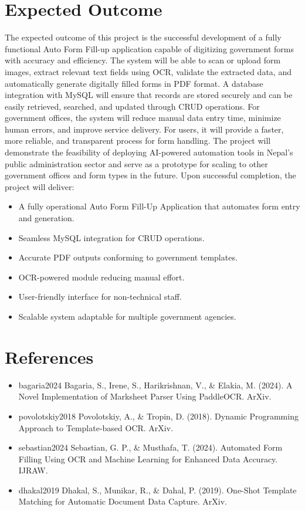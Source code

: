 \documentclass[12pt,a4paper]{report}
\begin{document}
\chapter{Expected Outcome}
The expected outcome of this project is the successful development of a fully functional Auto Form Fill-up application capable of digitizing government forms with accuracy and efficiency. The system will be able to scan or upload form images, extract relevant text fields using OCR, validate the extracted data, and automatically generate digitally filled forms in PDF format. A database integration with MySQL will ensure that records are stored securely and can be easily retrieved, searched, and updated through CRUD operations. For government offices, the system will reduce manual data entry time, minimize human errors, and improve service delivery. For users, it will provide a faster, more reliable, and transparent process for form handling. The project will demonstrate the feasibility of deploying AI-powered automation tools in Nepal’s public administration sector and serve as a prototype for scaling to other government offices and form types in the future.
Upon successful completion, the project will deliver:
\begin{itemize}
    \item A fully operational Auto Form Fill-Up Application that automates form entry and generation.
    \item Seamless MySQL integration for CRUD operations.
    \item Accurate PDF outputs conforming to government templates.
    \item OCR-powered module reducing manual effort.
    \item User-friendly interface for non-technical staff.
    \item Scalable system adaptable for multiple government agencies.
\end{itemize}

\chapter{References}
\begin{itemize}
\item{bagaria2024} Bagaria, S., Irene, S., Harikrishnan, V., \& Elakia, M. (2024). A Novel Implementation of Marksheet Parser Using PaddleOCR. ArXiv.
\item{povolotskiy2018} Povolotskiy, A., \& Tropin, D. (2018). Dynamic Programming Approach to Template-based OCR. ArXiv.
\item{sebastian2024} Sebastian, G. P., \& Musthafa, T. (2024). Automated Form Filling Using OCR and Machine Learning for Enhanced Data Accuracy. IJRAW.
\item{dhakal2019} Dhakal, S., Munikar, R., \& Dahal, P. (2019). One-Shot Template Matching for Automatic Document Data Capture. ArXiv.
\end{itemize}
\end{document}
